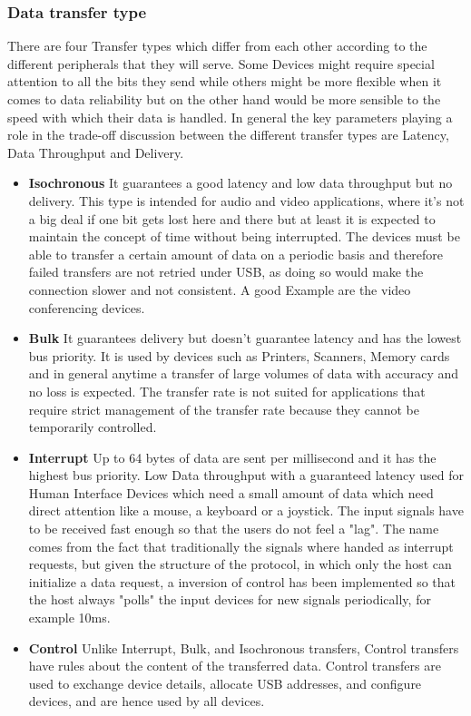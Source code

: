 \documentclass{article}
\begin{document}
\subsubsection{Data transfer type}
There are four Transfer types which differ from each other according to the different peripherals that they will serve. Some Devices might require special attention to all the bits they send while others might be more flexible when it comes to data reliability but on the other hand would be more sensible to the speed with which their data is handled. In general the key parameters playing a role in the trade-off discussion between the different transfer types are Latency, Data Throughput and Delivery. 
    \begin{itemize}
        \item \textbf{Isochronous}\newline
            It guarantees a good latency and low data throughput but no delivery. 
            This type is intended for audio and video applications, where it's not a big deal if one bit gets lost here and there but at least it is expected to maintain the concept of time without being interrupted. The devices must be able to transfer a certain amount of data on a periodic basis and therefore failed transfers are not retried under USB, as doing so would make the connection slower and not consistent. A good Example are the video conferencing devices. 
        \item \textbf{Bulk} \newline
            It guarantees delivery but doesn't guarantee latency and has the lowest bus priority. It is used by devices such as Printers, Scanners,  Memory cards and in general anytime a transfer of large volumes of data with accuracy and no loss is expected. The transfer rate is not suited for applications that require strict management of the transfer rate because they cannot be temporarily controlled.
        \item \textbf{Interrupt} \newline
            Up to 64 bytes of data are sent per millisecond and it has the highest bus priority.
            Low Data throughput with a guaranteed latency used for Human Interface Devices which need a small amount of data which need direct attention like a mouse, a keyboard or a joystick. The input signals have to be received fast enough so that the users do not feel a "lag". The name comes from the fact that traditionally the signals where handed as interrupt requests, but given the structure of the protocol, in which only the host can initialize a data request, a inversion of control has been implemented so that the host always "polls" the input devices for new signals periodically, for example 10ms.
        \item \textbf{Control} \newline
            Unlike Interrupt, Bulk, and Isochronous transfers, Control transfers have rules about the content of the transferred data.
            Control transfers are used to exchange device details, allocate USB addresses, and configure devices, and are hence used by all devices.
        
    \end{itemize}
\end{document}
